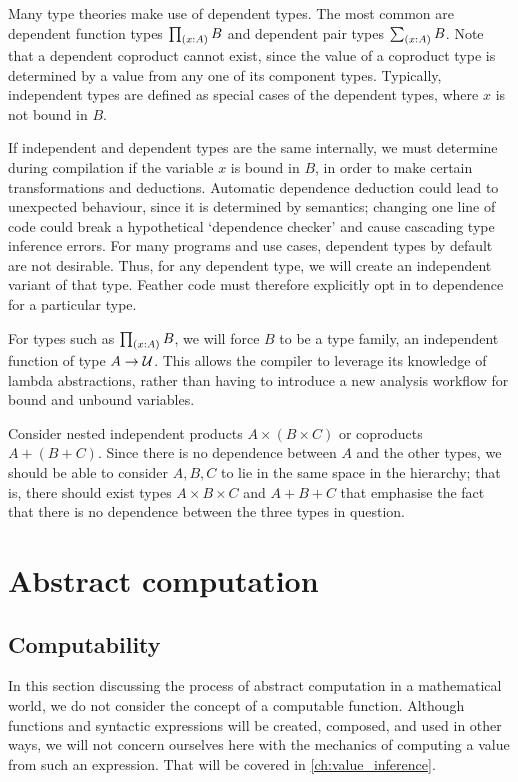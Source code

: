 \documentclass[11pt]{book}
\begin{document}
Many type theories make use of dependent types.
The most common are dependent function types \( \tprd{x:A} B \) and dependent pair types \( \tsm{x:A} B \).
Note that a dependent coproduct cannot exist, since the value of a coproduct type is determined by a value from any one of its component types.
Typically, independent types are defined as special cases of the dependent types, where \( x \) is not bound in \( B \).

If independent and dependent types are the same internally, we must determine during compilation if the variable \( x \) is bound in \( B \), in order to make certain transformations and deductions.
Automatic dependence deduction could lead to unexpected behaviour, since it is determined by semantics; changing one line of code could break a hypothetical `dependence checker' and cause cascading type inference errors.
For many programs and use cases, dependent types by default are not desirable.
Thus, for any dependent type, we will create an independent variant of that type.
Feather code must therefore explicitly opt in to dependence for a particular type.

For types such as \( \tprd{x:A} B \), we will force \( B \) to be a type family, an independent function of type \( A \to \mathcal{U} \).
This allows the compiler to leverage its knowledge of lambda abstractions, rather than having to introduce a new analysis workflow for bound and unbound variables.

Consider nested independent products \( A \times (B \times C) \) or coproducts \( A + (B + C) \).
Since there is no dependence between \( A \) and the other types, we should be able to consider \( A, B, C \) to lie in the same space in the hierarchy; that is, there should exist types \( A \times B \times C \) and \( A + B + C \) that emphasise the fact that there is no dependence between the three types in question.

\section{Abstract computation}

\subsection{Computability}

In this section discussing the process of abstract computation in a mathematical world, we do not consider the concept of a computable function.
Although functions and syntactic expressions will be created, composed, and used in other ways, we will not concern ourselves here with the mechanics of computing a value from such an expression.
That will be covered in \cref{ch:value_inference}.
\end{document}
